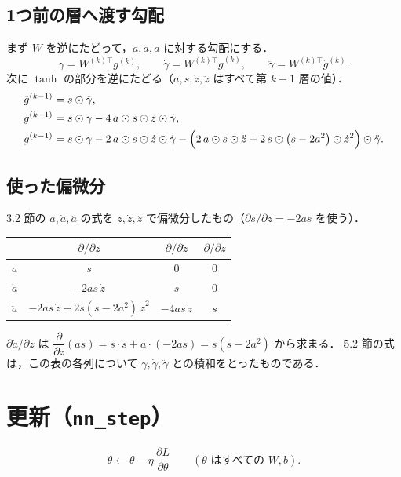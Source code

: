 \documentclass[a4paper,11pt]{ltjsarticle}
\newcommand{\code}[1]{\texttt{#1}}
\begin{document}
\subsection{1つ前の層へ渡す勾配}
まず $W$ を逆にたどって，$a,\dot a,\ddot a$ に対する勾配にする．
\begin{equation}
  \gamma=W^{(k)\top}g^{(k)},\qquad
  \dot\gamma=W^{(k)\top}\dot g^{(k)},\qquad
  \ddot\gamma=W^{(k)\top}\ddot g^{(k)}.
\end{equation}
次に $\tanh$ の部分を逆にたどる（$a,s,\dot z,\ddot z$ はすべて第 $k-1$ 層の値）．
\begin{align}
  \ddot g^{(k-1)} &= s\odot\ddot\gamma, \\
  \dot g^{(k-1)}  &= s\odot\dot\gamma-4\,a\odot s\odot\dot z\odot\ddot\gamma, \\
  g^{(k-1)}       &= s\odot\gamma-2\,a\odot s\odot\dot z\odot\dot\gamma
                     -\Bigl(2\,a\odot s\odot\ddot z+2\,s\odot\bigl(s-2a^2\bigr)\odot\dot z^{2}\Bigr)\odot\ddot\gamma.
\end{align}

\subsection{使った偏微分}
3.2 節の $a,\dot a,\ddot a$ の式を $z,\dot z,\ddot z$ で偏微分したもの（$\partial s/\partial z=-2as$ を使う）．
\begin{center}
\renewcommand{\arraystretch}{1.4}
\begin{tabular}{cccc}
\toprule
 & $\partial/\partial z$ & $\partial/\partial \dot z$ & $\partial/\partial \ddot z$ \\
\midrule
$a$       & $s$ & $0$ & $0$ \\
$\dot a$  & $-2as\,\dot z$ & $s$ & $0$ \\
$\ddot a$ & $-2as\,\ddot z-2s(s-2a^2)\,\dot z^2$ & $-4as\,\dot z$ & $s$ \\
\bottomrule
\end{tabular}
\end{center}
$\partial\ddot a/\partial z$ は $\dfrac{\partial}{\partial z}(as)=s\cdot s+a\cdot(-2as)=s(s-2a^2)$ から求まる．
5.2 節の式は，この表の各列について $\gamma,\dot\gamma,\ddot\gamma$ との積和をとったものである．

\section{更新（\code{nn\_step}）}
\begin{equation}
  \theta\leftarrow\theta-\eta\,\frac{\partial L}{\partial\theta}\qquad(\theta\text{ はすべての }W,b).
\end{equation}
\end{document}
